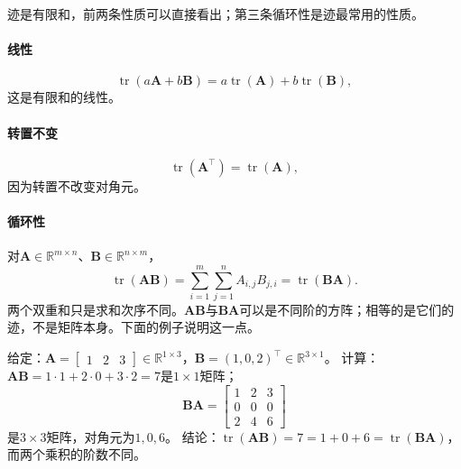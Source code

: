 迹是有限和，前两条性质可以直接看出；第三条循环性是迹最常用的性质。

\paragraph{线性}
\[
 \operatorname{tr}(a\bm A+b\bm B)=a\operatorname{tr}(\bm A)+b\operatorname{tr}(\bm B),
\]
这是有限和的线性。

\paragraph{转置不变}
\[
 \operatorname{tr}(\bm A^\top)=\operatorname{tr}(\bm A),
\]
因为转置不改变对角元。

\paragraph{循环性}
对$\bm A\in\mathbb R^{m\times n}$、$\bm B\in\mathbb R^{n\times m}$，
\begin{equation}
 \operatorname{tr}(\bm A\bm B)
 =\sum_{i=1}^m\sum_{j=1}^n A_{i,j}B_{j,i}
 =\operatorname{tr}(\bm B\bm A).
 \label{eq:linear-algebra-trace-cyclic}
\end{equation}
两个双重和只是求和次序不同。$\bm A\bm B$与$\bm B\bm A$可以是不同阶的方阵；相等的是它们的迹，不是矩阵本身。下面的例子说明这一点。
\begin{example}[不同阶乘积的迹相等]
\label{ex:ls-trace-cyclic-different-sizes}
给定：$\bm A=\left[\begin{smallmatrix}1&2&3\end{smallmatrix}\right]\in\mathbb R^{1\times3}$，$\bm B=(1,0,2)^\top\in\mathbb R^{3\times1}$。
计算：$\bm A\bm B=1\cdot1+2\cdot0+3\cdot2=7$是$1\times1$矩阵；
\[
 \bm B\bm A=\begin{bmatrix}1&2&3\\0&0&0\\2&4&6\end{bmatrix}
\]
是$3\times3$矩阵，对角元为$1,0,6$。
结论：$\operatorname{tr}(\bm A\bm B)=7=1+0+6=\operatorname{tr}(\bm B\bm A)$，而两个乘积的阶数不同。
\end{example}

